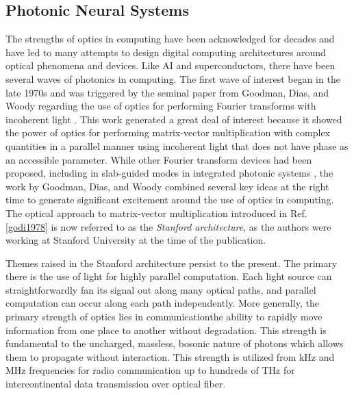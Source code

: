 \subsection{\label{sec:photonic_neural_systems}Photonic Neural Systems}
The strengths of optics in computing have been acknowledged for decades and have led to many attempts to design digital computing architectures around optical phenomena and devices. Like AI and superconductors, there have been several waves of photonics in computing. The first wave of interest began in the late 1970s and was triggered by the seminal paper from Goodman, Dias, and Woody regarding the use of optics for performing Fourier transforms with incoherent light \cite{godi1978}. This work generated a great deal of interest because it showed the power of optics for performing matrix-vector multiplication with complex quantities in a parallel manner using incoherent light that does not have phase as an accessible parameter. While other Fourier transform devices had been proposed, including in slab-guided modes in integrated photonic systems \cite{shha1968,anbo1977}, the work by Goodman, Dias, and Woody combined several key ideas at the right time to generate significant excitement around the use of optics in computing. The optical approach to matrix-vector multiplication introduced in Ref.\,\ref{godi1978} is now referred to as the \textit{Stanford architecture}, as the authors were working at Stanford University at the time of the publication.

Themes raised in the Stanford architecture persist to the present. The primary there is the use of light for highly parallel computation. Each light source can straightforwardly fan its signal out along many optical paths, and parallel computation can occur along each path independently. More generally, the primary strength of optics lies in communication\textemdash the ability to rapidly move information from one place to another without degradation. This strength is fundamental to the uncharged, massless, bosonic nature of photons which allows them to propagate without interaction. This strength is utilized from kHz and MHz frequencies for radio communication up to hundreds of THz for intercontinental data transmission over optical fiber.

